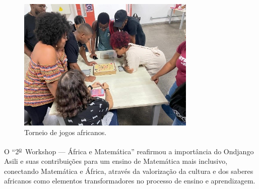 \documentclass{hipatia}
\newcommand{\superau}{\textsuperscript{\underline{a}}~}
\newcommand{\superou}{\textsuperscript{\underline{o}}~}
\begin{document}
\begin{figure}[htb]
    \centering
    \includegraphics[width=8.5cm]{WAM4.jpg}
    \caption{Torneio de jogos africanos.}
 \label{WAM4}
\end{figure}

O ``2\superou Workshop --- África e Matemática'' reafirmou a importância do Ondjango Asili e suas contribuições para um ensino de Matemática mais inclusivo, conectando Matemática e África, através da valorização da cultura e dos saberes africanos como elementos transformadores no processo de ensino e aprendizagem.




\end{document}

